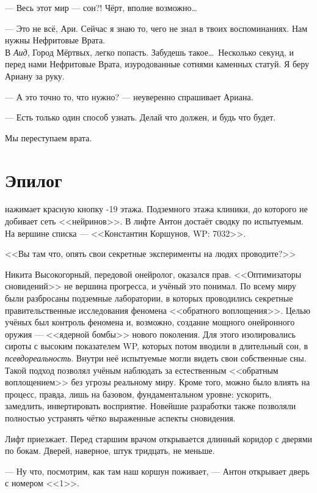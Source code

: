 \documentclass[openany, oneside]{book}
\begin{document}
--- Весь этот мир --- сон?! Чёрт, вполне возможно\dots

--- Это не всё, Ари. Сейчас я знаю то, чего не знал в твоих воспоминаниях. Нам нужны Нефритовые Врата.\\

В \textit{Аид}, Город Мёртвых, легко попасть. Забудешь такое\dots \ Несколько секунд, и перед нами Нефритовые Врата, изуродованные сотнями каменных статуй. Я беру Ариану за руку.

--- А это точно то, что нужно? --- неуверенно спрашивает Ариана.

--- Есть только один способ узнать. Делай что должен, и будь что будет.

Мы переступаем врата.

\chapter*{Эпилог}

 нажимает красную кнопку -19 этажа. Подземного этажа клиники, до которого не добивает сеть <<нейринов>>. В лифте Антон достаёт сводку по испытуемым. На вершине списка --- <<Константин Коршунов, WP: 7032>>.

<<Вы там что, опять свои секретные эксперименты на людях проводите?>>

Никита Высокогорный, передовой онейролог, оказался прав. <<Оптимизаторы сновидений>> не вершина прогресса, и учёный это понимал. По всему миру были разбросаны подземные лаборатории, в которых проводились секретные правительственные исследования феномена <<обратного воплощения>>. Целью учёных был контроль феномена и, возможно, создание мощного онейронного оружия --- <<ядерной бомбы>> нового поколения. Для этого изолировались сироты с высоким показателем WP, которых потом вводили в длительный сон, в \textit{псевдореальность}. Внутри неё испытуемые могли видеть свои собственные сны. Такой подход позволял учёным наблюдать за естественным <<обратным воплощением>> без угрозы реальному миру. Кроме того, можно было влиять на процесс, правда, лишь на базовом, фундаментальном уровне: ускорить, замедлить, инвертировать восприятие. Новейшие разработки также позволяли полностью устранять чётко выраженные аспекты сновидения.

Лифт приезжает. Перед старшим врачом открывается длинный коридор с дверями по бокам. Дверей, наверное, штук тридцать, не меньше.

--- Ну что, посмотрим, как там наш коршун поживает, --- Антон открывает дверь с номером <<1>>.
\end{document}
